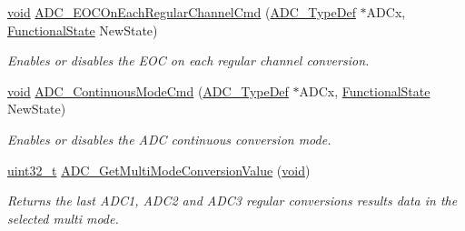\begin{DoxyCompactItemize}
\hyperlink{group___n_a_m_e_ga18028b8badbf1ea7e704ccac3c488e82}{void} \hyperlink{group___a_d_c___group4_ga5316caaa170415ef171c486d8f0bf22d}{A\-D\-C\-\_\-\-E\-O\-C\-On\-Each\-Regular\-Channel\-Cmd} (\hyperlink{struct_a_d_c___type_def}{A\-D\-C\-\_\-\-Type\-Def} $\ast$A\-D\-Cx, \hyperlink{group___exported__types_gac9a7e9a35d2513ec15c3b537aaa4fba1}{Functional\-State} New\-State)
\begin{DoxyCompactList}\small\item\em Enables or disables the E\-O\-C on each regular channel conversion. \end{DoxyCompactList}\item 
\hyperlink{group___n_a_m_e_ga18028b8badbf1ea7e704ccac3c488e82}{void} \hyperlink{group___a_d_c___group4_ga879d70e9345d35688590938503f961db}{A\-D\-C\-\_\-\-Continuous\-Mode\-Cmd} (\hyperlink{struct_a_d_c___type_def}{A\-D\-C\-\_\-\-Type\-Def} $\ast$A\-D\-Cx, \hyperlink{group___exported__types_gac9a7e9a35d2513ec15c3b537aaa4fba1}{Functional\-State} New\-State)
\begin{DoxyCompactList}\small\item\em Enables or disables the A\-D\-C continuous conversion mode. \end{DoxyCompactList}\item 
\hyperlink{stdint_8h_a435d1572bf3f880d55459d9805097f62}{uint32\-\_\-t} \hyperlink{group___a_d_c___group4_ga989f4365b56be99999b8ec096aba2081}{A\-D\-C\-\_\-\-Get\-Multi\-Mode\-Conversion\-Value} (\hyperlink{group___n_a_m_e_ga18028b8badbf1ea7e704ccac3c488e82}{void})
\begin{DoxyCompactList}\small\item\em Returns the last A\-D\-C1, A\-D\-C2 and A\-D\-C3 regular conversions results data in the selected multi mode. \end{DoxyCompactList}\end{DoxyCompactItemize}


